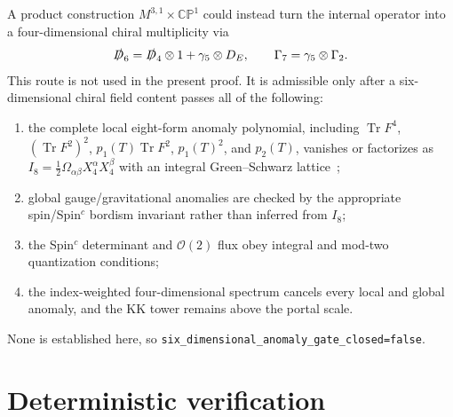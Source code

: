 \documentclass[11pt]{article}
\theoremstyle{definition}
\theoremstyle{remark}
\newcommand{\CP}{\mathbb {CP}}
\newcommand{\cO}{\mathcal O}
\newcommand{\Tr}{\operatorname{Tr}}
\begin{document}
A product construction
\(M^{3,1}\times\CP^1\) could instead turn the internal operator into a
four-dimensional chiral multiplicity via
\begin{equation}
 \slashed D_6=\slashed D_4\otimes1+\gamma_5\otimes D_E,
 \qquad \Gamma_7=\gamma_5\otimes\Gamma_2.
 \label{eq:product-dirac}
\end{equation}
This route is not used in the present proof.  It is admissible only after a
six-dimensional chiral field content passes all of the following:
\begin{enumerate}[label=(6D\arabic*)]
\item the complete local eight-form anomaly polynomial, including
  \(\Tr F^4\), \((\Tr F^2)^2\), \(p_1(T)\Tr F^2\), \(p_1(T)^2\), and
  \(p_2(T)\), vanishes or factorizes as
  \(I_8=\tfrac12\Omega_{\alpha\beta}X_4^\alpha X_4^\beta\) with an integral
  Green--Schwarz lattice~\cite{AlvarezGaumeWitten1984APE4SQM};
\item global gauge/gravitational anomalies are checked by the appropriate
  spin/Spin\({}^c\) bordism invariant rather than inferred from \(I_8\);
\item the Spin\({}^c\) determinant and \(\cO(2)\) flux obey integral and
  mod-two quantization conditions;
\item the index-weighted four-dimensional spectrum cancels every local and
  global anomaly, and the KK tower remains above the portal scale.
\end{enumerate}
None is established here, so
\texttt{six\_dimensional\_anomaly\_gate\_closed=false}.

\section{Deterministic verification}
\end{document}
